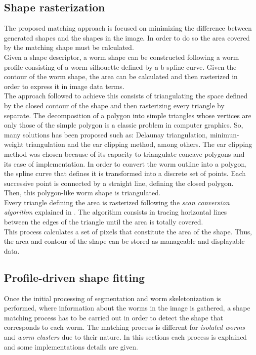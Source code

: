 \subsection{Shape rasterization}
\label{sec:metrast}

The proposed matching approach is focused on minimizing the difference between generated
shapes and the shapes in the image. In order to do so the area covered by the matching shape
must be calculated.\\ 
Given a shape descriptor, a worm shape can be
constructed following a worm profile consisting of a worm silhouette defined by 
a b-spline curve. Given the contour of the worm shape, the area can be calculated and 
then rasterized in order to express it in image data terms.\\

The approach followed to achieve this consists of triangulating the space defined by the
closed contour of the shape and then rasterizing every triangle by separate. The
decomposition of a polygon into simple triangles whose vertices are only those of
the simple polygon is a classic problem in computer graphics. So, many solutions
has been proposed such as: Delaunay triangulation, minimun-weight triangulation and
the ear clipping method, among others. The ear clipping method was chosen because
of its capacity to triangulate concave polygons and its ease of implementation.
In order to convert the worm outline into a polygon, the spline curve that defines it 
is transformed into a discrete set of points. Each successive point is connected
by a straight line, defining the closed polygon. Then, this polygon-like worm shape
is triangulated.\\

Every triangle defining the area is rasterized following the \emph{scan conversion algorithm}
explained in \cite{scanconversion}. The algorithm consists in tracing horizontal lines 
between the edges of the triangle until the area is totally covered.\\

This process calculates a set of pixels that constitute the area of the shape. Thus, 
the area and contour of the shape can be stored as manageable and displayable data.


\subsection{Profile-driven shape fitting}
\label{sec:metfit}

Once the initial processing of segmentation and worm skeletonization is performed, where 
information about the worms in the image is gathered, a shape matching process has to be 
carried out in order to detect the shape that corresponds to each worm.
 The matching process is different for
\emph{isolated worms} and \emph{worm clusters}  
due to their nature. In this sections each process is explained and some 
implementations details are given.


